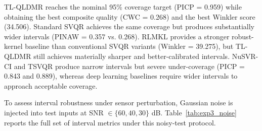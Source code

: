 \documentclass[a4paper]{cas-sc}
\begin{document}
TL-QLDMR reaches the nominal 95\% coverage target (PICP = 0.959) while obtaining the best composite quality (CWC = 0.268) and the best Winkler score (34.506). Standard SVQR achieves the same coverage but produces substantially wider intervals (PINAW = 0.357 vs. 0.268). RLMKL provides a stronger robust-kernel baseline than conventional SVQR variants (Winkler = 39.275), but TL-QLDMR still achieves materially sharper and better-calibrated intervals. NuSVR-CI and TSVQR produce narrow intervals but severe under-coverage (PICP = 0.843 and 0.889), whereas deep learning baselines require wider intervals to approach acceptable coverage.

To assess interval robustness under sensor perturbation, Gaussian noise is injected into test inputs at SNR $\in \{60,40,30\}$ dB.
Table~\ref{tab:exp3_noise} reports the full set of interval metrics under this noisy-test protocol.

\FloatBarrier
\end{document}
